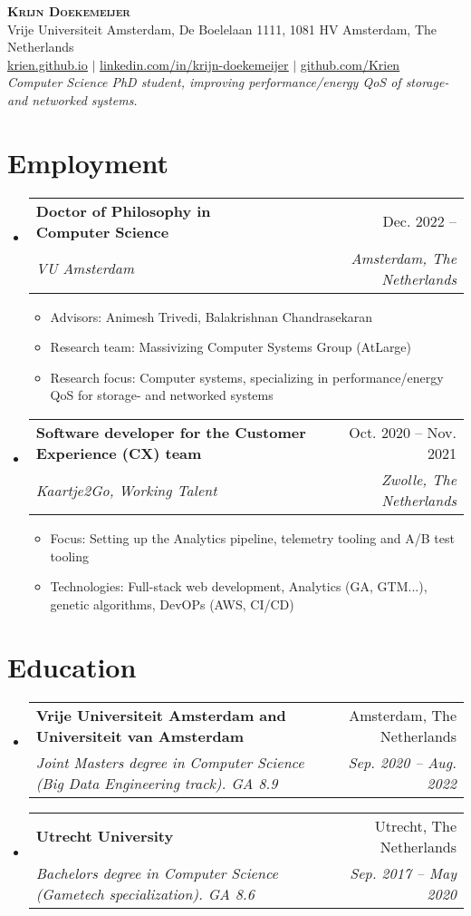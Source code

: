 \documentclass[letterpaper,11pt]{article}
\makeatletter
\newcommand{\resumeItem}[1]{
  \item\small{
    {#1 \vspace{-2pt}}
  }
}
\newcommand{\resumeSubheading}[4]{
  \vspace{-2pt}\item
    \begin{tabular*}{0.97\textwidth}[t]{l@{\extracolsep{\fill}}r}
      \textbf{#1} & #2 \\
      \textit{\small#3} & \textit{\small #4} \\
    \end{tabular*}\vspace{-7pt}
}
\newcommand{\resumeSubHeadingListStart}{\begin{itemize}[leftmargin=0.15in, label={}]}
\newcommand{\resumeSubHeadingListEnd}{\end{itemize}}
\newcommand{\resumeItemListStart}{\begin{itemize}}
\newcommand{\resumeItemListEnd}{\end{itemize}\vspace{-5pt}}
\makeatother
\begin{document}
\begin{center}
    \textbf{\Huge \scshape Krijn Doekemeijer} \\ \vspace{1pt}
    \small Vrije Universiteit Amsterdam, De Boelelaan 1111, 1081 HV Amsterdam, The Netherlands \\ \vspace{1pt}
    \href{https://krien.github.io/}{\underline{krien.github.io}} $|$
    \href{https://linkedin.com/in/krijn-doekemeijer-9692801aa}{\underline{linkedin.com/in/krijn-doekemeijer}} $|$
    \href{https://github.com/Krien}{\underline{github.com/Krien}} \\
    \textit{ Computer Science PhD student, improving performance/energy QoS of storage- and networked systems. } 
\end{center}

\section{Employment}
  \resumeSubHeadingListStart
    \resumeSubheading
      {Doctor of Philosophy in Computer Science}{Dec. 2022 --}
      {VU Amsterdam}{Amsterdam, The Netherlands}
      \resumeItemListStart
      \resumeItem{ 
        Advisors: Animesh Trivedi, Balakrishnan Chandrasekaran
      }
      \resumeItem{ 
        Research team: Massivizing Computer Systems Group (AtLarge)
      }
      \resumeItem{
        Research focus: Computer systems, specializing in performance/energy QoS for storage- and networked systems
      }
      \resumeItemListEnd
    \resumeSubheading
      {Software developer for the Customer Experience (CX) team}{Oct. 2020 -- Nov. 2021}
      {Kaartje2Go, Working Talent}{Zwolle, The Netherlands}
      \resumeItemListStart
        \resumeItem{ 
          Focus: Setting up the Analytics pipeline, telemetry tooling and A/B test tooling
        }
        \resumeItem{
          Technologies: Full-stack web development, Analytics (GA, GTM...), genetic algorithms, DevOPs (AWS, CI/CD)
        }
      \resumeItemListEnd

  \resumeSubHeadingListEnd

\section{Education}
\resumeSubHeadingListStart
    \resumeSubheading
    {Vrije Universiteit Amsterdam and Universiteit van Amsterdam}{Amsterdam, The Netherlands}
    {Joint Masters degree in Computer Science (Big Data Engineering track). GA 8.9}{Sep. 2020 -- Aug. 2022}
  \resumeSubheading
    {Utrecht University}{Utrecht, The Netherlands}
    {Bachelors degree in Computer Science (Gametech specialization). GA 8.6 }{Sep. 2017 -- May 2020}
\resumeSubHeadingListEnd
\end{document}
